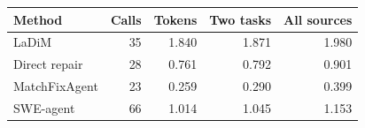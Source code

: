 \begin{tabular*}{\linewidth}{@{\extracolsep{\fill}}lrrrr@{}}
\toprule
\textbf{Method} & \textbf{Calls} & \textbf{Tokens} & \textbf{Two tasks} & \textbf{All sources} \\
\midrule
LaDiM & 35 & 1.840 & 1.871 & 1.980 \\
Direct repair & 28 & 0.761 & 0.792 & 0.901 \\
MatchFixAgent & 23 & 0.259 & 0.290 & 0.399 \\
SWE-agent & 66 & 1.014 & 1.045 & 1.153 \\
\bottomrule
\end{tabular*}
